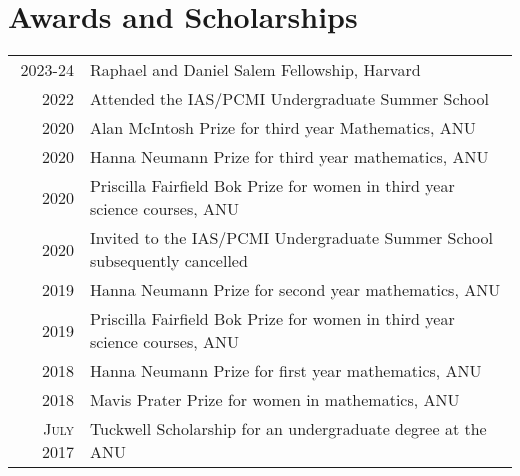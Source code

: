 \documentclass[a4paper,11pt]{article} %
\begin{document}

\section{Awards and Scholarships}

\begin{tabular}{rl}
2023-24 & Raphael and Daniel Salem Fellowship, \footnotesize Harvard \normalsize\\

2022 & Attended the IAS/PCMI Undergraduate Summer School\\

2020 & Alan McIntosh Prize \footnotesize for third year Mathematics, ANU \normalsize\\

2020 & Hanna Neumann Prize \footnotesize for third year mathematics, ANU \normalsize\\

2020 & Priscilla Fairfield Bok Prize \footnotesize for women in third year science courses, ANU \normalsize\\

2020 & Invited to the IAS/PCMI Undergraduate Summer School \footnotesize subsequently cancelled\\

2019 & Hanna Neumann Prize \footnotesize for second year mathematics, ANU \normalsize\\

2019 & Priscilla Fairfield Bok Prize \footnotesize for women in third year science courses, ANU \normalsize\\

2018 & Hanna Neumann Prize \footnotesize for first year mathematics, ANU \normalsize\\

2018 & Mavis Prater Prize \footnotesize for women in mathematics, ANU \normalsize\\

\textsc{July} 2017 & Tuckwell Scholarship \footnotesize for an undergraduate degree at the ANU\\

\end{tabular}

\end{document}
